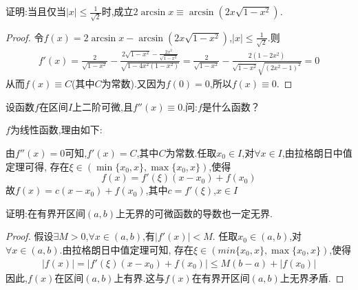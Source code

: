 \documentclass[lang=cn,newtx,10pt,scheme=chinese]{../Template/elegantbook}
\begin{document}
\begin{exercise}
    证明:当且仅当\(\vert x\vert\leq\frac{1}{\sqrt{2}}\)时,成立\(2\arcsin x\equiv\arcsin(2x\sqrt{1 - x^{2}})\).
    \begin{proof}
    令$f(x)=2\arcsin x-\arcsin(2x\sqrt{1 - x^{2}})$,\(\vert x\vert\leq\frac{1}{\sqrt{2}}\).则
    \begin{equation}
        \begin{split}
            f'\left( x \right) =\frac{2}{\sqrt{1-x^2}}-\frac{2\sqrt{1-x^2}-\frac{2x^2}{\sqrt{1-x^2}}}{\sqrt{1-4x^2\left( 1-x^2 \right)}}
            =\frac{2}{\sqrt{1-x^2}}-\frac{2\left( 1-2x^2 \right)}{\sqrt{1-x^2}\sqrt{\left( 2x^2-1 \right) ^2}}=0
        \end{split}
      \nonumber
    \end{equation}
    从而$f(x)\equiv C$(其中$C$为常数).又因为$f(0)=0$,所以$f(x)\equiv0$.
    \end{proof}
\end{exercise}

\begin{exercise}
    设函数\(f\)在区间\(I\)上二阶可微,且\(f''(x)\equiv0\).问:$f$是什么函数？
    \begin{solution}
    $f$为线性函数,理由如下:

    由$f''(x)=0$可知,$f'(x)=C$,其中$C$为常数.任取$x_0\in I$,对$\forall x\in I$,由拉格朗日中值定理可得,
    存在$\xi\in(\min\{x_0,x\},\max\{x_0,x\})$,使得
    \begin{equation}
        f(x)=f'(\xi)(x-x_0)+f(x_0)
        \nonumber
    \end{equation}
    故$f(x)=c(x-x_0)+f(x_0)$,其中$c=f'(\xi)$,$x\in I$
    \end{solution}
\end{exercise}

\begin{exercise}
    证明:在有界开区间\((a,b)\)上无界的可微函数的导数也一定无界.
    \begin{proof}
        假设$\exists M>0$,$\forall x\in(a,b)$,有$|f'(x)|<M$.
        任取$x_0\in(a,b)$,对$\forall x\in(a,b)$.由拉格朗日中值定理可知,
        存在$\xi\in(min\{x_0,x\},\max\{x_0,x\})$,使得
        \begin{equation}
            \begin{split}
                |f(x)|=|f'(\xi )(x-x_0)+f(x_0)|\leqslant M\left( b-a \right) +|f(x_0)|
            \end{split}
            \nonumber
        \end{equation}
        因此,$f(x)$在区间$(a,b)$上有界.这与$f(x)$在有界开区间\((a,b)\)上无界矛盾.
    \end{proof}
\end{exercise}
\end{document}
